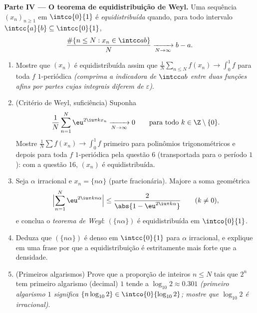 \begin{problem}
\medskip
\noindent\textbf{Parte IV --- O teorema de equidistribuição de Weyl.}
Uma sequência $(x_n)_{n\geq1}$ em $\intco{0}{1}$ é
\emph{equidistribuída} quando, para todo intervalo
$\intcc{a}{b} \subseteq \intcc{0}{1}$,
\[
\frac{\#\{n \leq N : x_n \in \intcc ab\}}{N}
\xrightarrow[N\to\infty]{} b - a .
\]
\begin{enumerate}[resume]
  \item Mostre que $(x_n)$ é equidistribuída assim que
        $\frac1N\sum_{n\leq N}f(x_n) \to \int_0^1 f$ para toda $f$
        \emph{} $1$-periódica \emph{(comprima a
        indicadora de $\intcc ab$ entre duas funções afins por partes
         cujas integrais diferem de
        $\varepsilon$)}.
  \item (Critério de Weyl, suficiência) Suponha
        \[
        \frac{1}{N}\sum_{n=1}^{N}\eu^{2\iu\pi kx_n}
        \xrightarrow[N\to\infty]{} 0
        \qquad\text{para todo } k \in \Z\setminus\{0\} .
        \]
        Mostre $\frac1N\sum f(x_n) \to \int_0^1f$ primeiro para
        polinômios trigonométricos e depois para toda $f$ 
        $1$-periódica pela questão 6 (transportada para o período
        $1$): com a questão 16, $(x_n)$ é equidistribuída.
  \item Seja $\alpha$ irracional e $x_n = \{n\alpha\}$
        (parte fracionária). Majore a soma geométrica
        \[
        \Bigl|\sum_{n=1}^{N}\eu^{2\iu\pi kn\alpha}\Bigr|
        \leq \frac{2}{\abs{1 - \eu^{2\iu\pi k\alpha}}}
        \qquad (k \neq 0),
        \]
        e conclua o \emph{teorema de Weyl}: $(\{n\alpha\})$ é
        equidistribuída em $\intco{0}{1}$.
  \item Deduza que $(\{n\alpha\})$ é denso em
        $\intcc{0}{1}$ para $\alpha$ irracional, e explique em
        uma frase por que a equidistribuição é estritamente mais forte
        que a densidade.
  \item (Primeiros algarismos) Prove que a proporção de inteiros
        $n \leq N$ tais que $2^n$ tem primeiro algarismo (decimal)
        $1$ tende a $\log_{10}2 \approx 0.301$ \emph{(primeiro
        algarismo $1$ significa $\{n\log_{10}2\} \in
        \intco{0}{\log_{10}2}$; mostre que $\log_{10}2$ é
        irracional)}.
\end{enumerate}


\end{problem}
